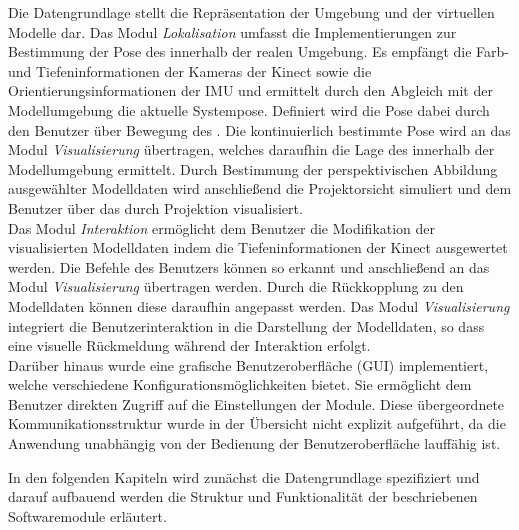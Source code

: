 Die Datengrundlage stellt die Repräsentation der Umgebung und der virtuellen Modelle dar. Das Modul \textit{Lokalisation} umfasst die Implementierungen zur Bestimmung der Pose des  innerhalb der realen Umgebung. Es empfängt die Farb- und Tiefeninformationen der Kameras der Kinect sowie die Orientierungsinformationen der IMU und ermittelt durch den Abgleich mit der Modellumgebung die aktuelle Systempose. Definiert wird die Pose dabei durch den Benutzer über Bewegung des . Die kontinuierlich bestimmte Pose wird an das Modul \textit{Visualisierung} übertragen, welches daraufhin die Lage des  innerhalb der Modellumgebung ermittelt. Durch Bestimmung der perspektivischen Abbildung ausgewählter Modelldaten wird anschließend die Projektorsicht simuliert und dem Benutzer über das \kps{} durch Projektion visualisiert.\\ 

Das Modul \textit{Interaktion} ermöglicht dem Benutzer die Modifikation der visualisierten Modelldaten indem die Tiefeninformationen der Kinect ausgewertet werden. Die Befehle des Benutzers können so erkannt und anschließend an das Modul \textit{Visualisierung} übertragen werden. Durch die Rückkopplung zu den Modelldaten können diese daraufhin angepasst werden. Das Modul \textit{Visualisierung} integriert die Benutzerinteraktion in die Darstellung der Modelldaten, so dass eine visuelle Rückmeldung während der Interaktion erfolgt.\\

Darüber hinaus wurde eine grafische Benutzeroberfläche (GUI) implementiert, welche verschiedene Konfigurationsmöglichkeiten bietet. Sie ermöglicht dem Benutzer direkten Zugriff auf die Einstellungen der Module. Diese übergeordnete Kommunikationsstruktur wurde in der Übersicht nicht explizit aufgeführt, da die Anwendung unabhängig von der Bedienung der Benutzeroberfläche lauffähig ist.\\


In den folgenden Kapiteln wird zunächst die Datengrundlage spezifiziert und darauf aufbauend werden die Struktur und Funktionalität der beschriebenen Softwaremodule erläutert.\\


